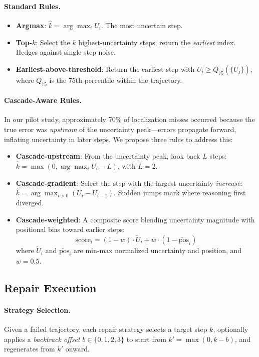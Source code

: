 \documentclass[letterpaper]{article}
\begin{document}
\paragraph{Standard Rules.}
\begin{itemize}
  \item \textbf{Argmax}: $\hat{k} = \arg\max_i U_i$. The most uncertain step.
  \item \textbf{Top-$k$}: Select the $k$ highest-uncertainty steps; return the \emph{earliest} index. Hedges against single-step noise.
  \item \textbf{Earliest-above-threshold}: Return the earliest step with $U_i \geq Q_{75}(\{U_j\})$, where $Q_{75}$ is the 75th percentile within the trajectory.
\end{itemize}

\paragraph{Cascade-Aware Rules.} In our pilot study, approximately 70\% of localization misses occurred because the true error was \emph{upstream} of the uncertainty peak---errors propagate forward, inflating uncertainty in later steps. We propose three rules to address this:

\begin{itemize}
  \item \textbf{Cascade-upstream}: From the uncertainty peak, look back $L$ steps: $\hat{k} = \max(0, \arg\max_i U_i - L)$, with $L=2$.
  \item \textbf{Cascade-gradient}: Select the step with the largest uncertainty \emph{increase}: $\hat{k} = \arg\max_{i>0} (U_i - U_{i-1})$. Sudden jumps mark where reasoning first diverged.
  \item \textbf{Cascade-weighted}: A composite score blending uncertainty magnitude with positional bias toward earlier steps:
  \begin{equation}
    \text{score}_i = (1 - w) \cdot \widetilde{U}_i + w \cdot (1 - \widetilde{\text{pos}}_i)
  \end{equation}
  where $\widetilde{U}_i$ and $\widetilde{\text{pos}}_i$ are min-max normalized uncertainty and position, and $w = 0.5$.
\end{itemize}

\subsection{Repair Execution}

\paragraph{Strategy Selection.} Given a failed trajectory, each repair strategy selects a target step $k$, optionally applies a \emph{backtrack offset} $b \in \{0, 1, 2, 3\}$ to start from $k' = \max(0, k - b)$, and regenerates from $k'$ onward.
\end{document}
